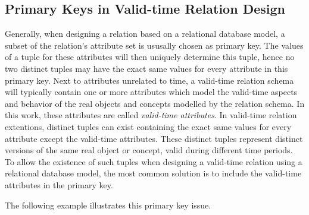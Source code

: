 \subsection{\label{subsubsec:primary-key}Primary Keys in Valid-time Relation Design}
Generally, when designing a relation based on a relational database model, a subset of the relation's attribute set is ususally chosen as primary key. The values of a tuple for these attributes will then uniquely determine this tuple, hence no two distinct tuples may have the exact same values for every attribute in this primary key. Next to attributes unrelated to time, a valid-time relation schema will typically contain one or more attributes which model the valid-time aspects and behavior of the real objects and concepts modelled by the relation schema. In this work, these attributes are called \emph{valid-time attributes}. In valid-time relation extentions, distinct tuples can exist containing the exact same values for every attribute except the valid-time attributes. These distinct tuples represent distinct versions of the same real object or concept, valid during different time periods. To allow the existence of such tuples when designing a valid-time relation using a relational database model, the most common solution is to include the valid-time attributes in the primary key.

The following example illustrates this primary key issue.

